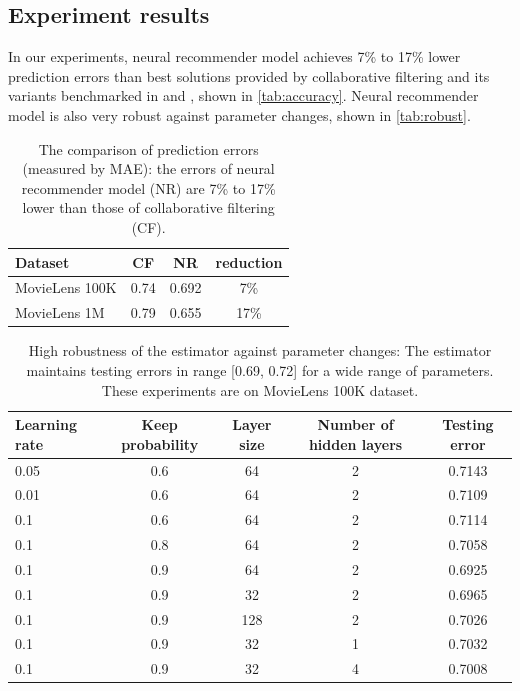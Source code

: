 \documentclass[twocolumn]{article}
\begin{document}
\subsection{Experiment results}
In our experiments, neural recommender model achieves 7\% to 17\% lower 
prediction errors than best solutions provided by collaborative filtering and 
its variants benchmarked in \cite{hwang2016efficient} and 
\cite{polatidis2016multi}, shown in \autoref{tab:accuracy}.
Neural recommender model is also very robust against 
parameter changes, shown in \autoref{tab:robust}.
\begin{table}[h]
	\centering
	\caption{The comparison of prediction errors (measured by MAE):
		the errors of neural recommender model (NR) are 7\% to 17\% lower than 
		those of collaborative filtering (CF).}
	\begin{tabularx}{0.5\textwidth}{ |X|c|c|c| }  \hline
		\textbf{Dataset} & \textbf{CF} & \textbf{NR} & \textbf{reduction} 
		\\ \hline
		MovieLens 100K & 0.74 & 0.692 & 7\% \\ \hline
		MovieLens 1M & 0.79 & 0.655 & 17\% \\ \hline
	\end{tabularx}
	\label{tab:accuracy}
\end{table}
\begin{table}[h]
	\centering
	\caption{High robustness of the estimator against parameter changes:
		The estimator maintains testing errors in range [0.69, 0.72] for a wide 
		range of parameters. These experiments are on MovieLens 100K dataset.}
	\begin{tabularx}{\textwidth}{ |X|c|c|c|c| } \hline
		 \textbf{Learning rate} & \textbf{Keep probability} & \textbf{Layer 
		 size} & \textbf{Number of hidden layers} & \textbf{Testing error} \\ 
		 \hline
		 0.05 & 0.6 & 64 & 2 & 0.7143 \\ \hline
		 0.01 & 0.6 & 64 & 2 & 0.7109 \\ \hline
		 0.1 & 0.6 & 64 & 2 & 0.7114 \\ \hline
		 0.1 & 0.8 & 64 & 2 & 0.7058 \\ \hline
		 0.1 & 0.9 & 64 & 2 & 0.6925 \\ \hline
		 0.1 & 0.9 & 32 & 2 & 0.6965 \\ \hline
		 0.1 & 0.9 & 128 & 2 & 0.7026 \\ \hline
		 0.1 & 0.9 & 32 & 1 & 0.7032 \\ \hline
		 0.1 & 0.9 & 32 & 4 & 0.7008 \\ \hline
	\end{tabularx}
	\label{tab:robust}
\end{table}
\end{document}
